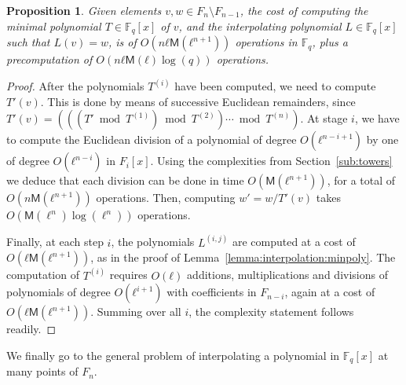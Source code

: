 \documentclass{lms}
\newtheorem{prop}[thm]{Proposition}
\def\cout#1{\mathsf{#1}}
\newcommand{\F}{\mathbb{F}}
\newcommand{\MM}{\cout{M}}
\begin{document}
\begin{prop}
  Given elements $v,w∈F_n\setminus F_{n-1}$, the cost of computing the
  minimal polynomial $T∈\F_q[x]$ of $v$, and the interpolating
  polynomial $L∈\F_q[x]$ such that $L(v)=w$, is of $O(nℓ\MM(ℓ^{n+1}))$
  operations in $\F_q$, plus a precomputation of $O(nℓ\MM(ℓ)\log(q))$
  operations.
\end{prop}
\begin{proof}
  After the polynomials $T^{(i)}$ have been computed, we need to
  compute $T'(v)$. This is done by means of successive Euclidean
  remainders, since
  $T'(v) = (((T' \bmod T^{(1)}) \bmod T^{(2)}) \cdots \bmod T^{(n)})$.
  At stage $i$, we have to compute the Euclidean division of a
  polynomial of degree $O(ℓ^{n-i+1})$ by one of degree $O(ℓ^{n-i})$ in
  $F_i[x]$. Using the complexities from Section~\ref{sub:towers} we
  deduce that each division can be done in time $O(\MM(ℓ^{n+1}))$, for
  a total of $O(n\MM(ℓ^{n+1}))$ operations. Then, computing
  $w' = w/T'(v)$ takes $O(\MM(\ell^n)\log(\ell^n))$ operations.

  Finally, at each step $i$, the polynomials $L^{(i,j)}$ are computed
  at a cost of $O(ℓ\MM(ℓ^{n+1}))$, as in the proof of
  Lemma~\ref{lemma:interpolation:minpoly}.  The computation of
  $T^{(i)}$ requires $O(ℓ)$ additions, multiplications and divisions
  of polynomials of degree $O(ℓ^{i+1})$ with coefficients in
  $F_{n-i}$, again at a cost of $O(ℓ\MM(ℓ^{n+1}))$. Summing over all
  $i$, the complexity statement follows readily.
\end{proof}

We finally go to the general problem of interpolating a polynomial in
$\F_q[x]$ at many points of $F_n$.
\end{document}
